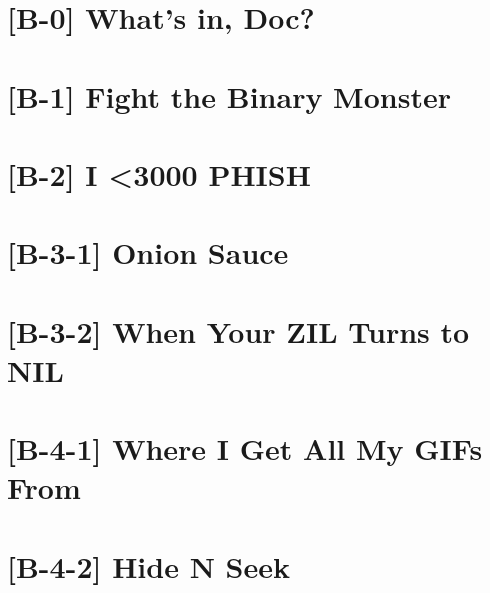 
\section{[B-0] What's in, Doc?}





\section{[B-1] Fight the Binary Monster}



\section{[B-2] I <3000 PHISH}



\section{[B-3-1] Onion Sauce}



\section{[B-3-2] When Your ZIL Turns to NIL}



\section{[B-4-1] Where I Get All My GIFs From}



\section{[B-4-2] Hide N Seek}

